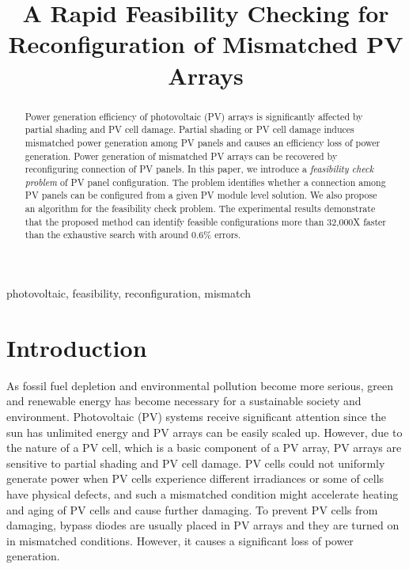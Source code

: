 \documentclass[conference]{pvsctran}
\begin{document}
\title{ A Rapid Feasibility Checking for Reconfiguration of Mismatched PV Arrays}

\author{ 
}

\setlength{\columnsep}{0.25in}


\maketitle


\begin{abstract}
Power generation efficiency of photovoltaic (PV) arrays is significantly affected by partial shading and PV cell damage. Partial shading or PV cell damage induces mismatched power generation among PV panels and causes an efficiency loss of power generation. Power generation of mismatched PV arrays can be recovered by reconfiguring connection of PV panels. 
In this paper, we introduce a \textit{feasibility check problem} of PV panel configuration.
The problem identifies whether a connection among PV panels can be configured from a given PV module level solution. 
We also propose an algorithm for the feasibility check problem. The experimental results demonstrate that the proposed method can identify feasible configurations more than 32,000X faster than the exhaustive search with around 0.6\% errors. 
\end{abstract}

\begin{IEEEkeywords}
photovoltaic, feasibility, reconfiguration, mismatch
\end{IEEEkeywords}

\IEEEpeerreviewmaketitle



\section{Introduction}
As fossil fuel depletion and environmental pollution become more serious, green and renewable energy has become necessary for a sustainable society and environment. 
Photovoltaic (PV) systems receive significant attention since the sun has unlimited energy and PV arrays can be easily scaled up. 
However, due to the nature of a PV cell, which is a basic component of a PV array, PV arrays are sensitive to partial shading and PV cell damage. 
PV cells could not uniformly generate power when PV cells experience different irradiances or some of cells have physical defects, and such a mismatched condition might accelerate heating and aging of PV cells and cause further damaging. 
To prevent PV cells from damaging, bypass diodes are usually placed in PV arrays and they are turned on in mismatched conditions. 
However, it causes a significant loss of power generation. 
\end{document}
